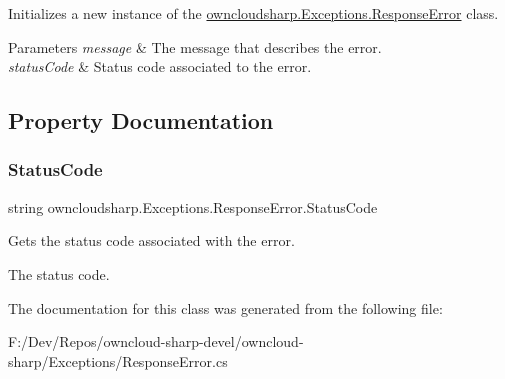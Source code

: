 Initializes a new instance of the \hyperlink{classowncloudsharp_1_1_exceptions_1_1_response_error}{owncloudsharp.\+Exceptions.\+Response\+Error} class. 


\begin{DoxyParams}{Parameters}
{\em message} & The message that describes the error.\\
\hline
{\em status\+Code} & Status code associated to the error.\\
\hline
\end{DoxyParams}


\subsection{Property Documentation}
\mbox{\label{classowncloudsharp_1_1_exceptions_1_1_response_error_ab5291c58a78e4c72c2a7d1bf5f1a48c8}} 
\subsubsection{\texorpdfstring{Status\+Code}{StatusCode}}
{\footnotesize\ttfamily string owncloudsharp.\+Exceptions.\+Response\+Error.\+Status\+Code\hspace{0.3cm}{\ttfamily [get]}}



Gets the status code associated with the error. 

The status code.

The documentation for this class was generated from the following file\+:\begin{DoxyCompactItemize}
\item 
F\+:/\+Dev/\+Repos/owncloud-\/sharp-\/devel/owncloud-\/sharp/\+Exceptions/Response\+Error.\+cs\end{DoxyCompactItemize}
